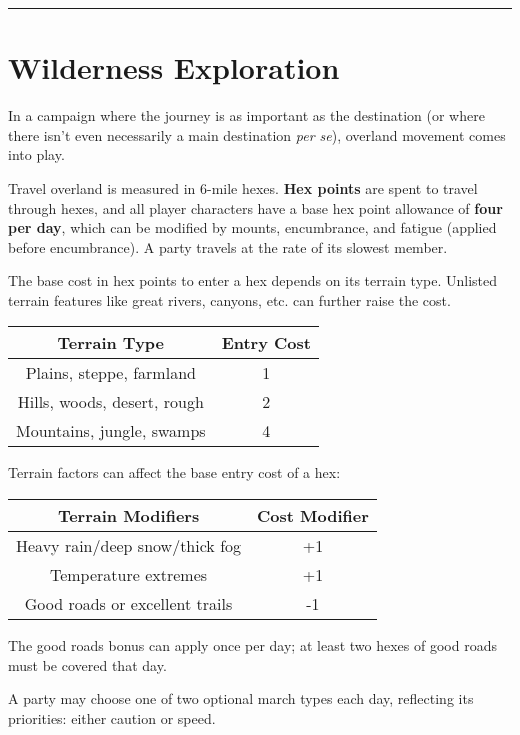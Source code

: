 \documentclass{article}
\begin{document}
\begin{multicols}{2}
\begin{center}\rule{0.5\linewidth}{0.5pt}\end{center}

\section{Wilderness Exploration}\label{wilderness-exploration}

In a campaign where the journey is as important as the destination (or
where there isn't even necessarily a main destination \emph{per se}),
overland movement comes into play.

Travel overland is measured in 6-mile hexes. \textbf{Hex points} are
spent to travel through hexes, and all player characters have a base hex
point allowance of \textbf{four per day}, which can be modified by
mounts, encumbrance, and fatigue (applied before encumbrance). A party
travels at the rate of its slowest member.

The base cost in hex points to enter a hex depends on its terrain type.
Unlisted terrain features like great rivers, canyons, etc. can further
raise the cost.

\begin{longtable}[]{@{}cc@{}}
\toprule\noalign{}
Terrain Type & Entry Cost \\
\midrule\noalign{}
\endhead
\bottomrule\noalign{}
\endlastfoot
Plains, steppe, farmland & 1 \\
Hills, woods, desert, rough & 2 \\
Mountains, jungle, swamps & 4 \\
\end{longtable}

Terrain factors can affect the base entry cost of a hex:

\begin{longtable}[]{@{}cc@{}}
\toprule\noalign{}
Terrain Modifiers & Cost Modifier \\
\midrule\noalign{}
\endhead
\bottomrule\noalign{}
\endlastfoot
Heavy rain/deep snow/thick fog & +1 \\
Temperature extremes & +1 \\
Good roads or excellent trails & -1 \\
\end{longtable}

The good roads bonus can apply once per day; at least two hexes of good
roads must be covered that day.

A party may choose one of two optional march types each day, reflecting
its priorities: either caution or speed.


\end{multicols}
\end{document}
